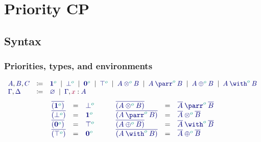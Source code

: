 \documentclass[main.tex]{subfiles}
\begin{document}
\section{Priority CP}

\subsection{Syntax}

\subsubsection{Priorities, types, and environments}
\[
\begin{array}{lcl}
  \ty{A}, \ty{B}, \ty{C}
  & \coloneqq & \ty{\tyone[\cs{o}]}
    \sep        \ty{\tybot[\cs{o}]}
    \sep        \ty{\tynil[\cs{o}]}
    \sep        \ty{\tytop[\cs{o}]}
    \sep        \ty{\tytens[\cs{o}]{A}{B}}
    \sep        \ty{\typarr[\cs{o}]{A}{B}}
    \sep        \ty{\typlus[\cs{o}]{A}{B}}
    \sep        \ty{\tywith[\cs{o}]{A}{B}}
  \\
  \ty{\Gamma}, \ty{\Delta}
  & \coloneqq & \ty{\emptyenv}
    \sep        \ty{\Gamma}, \tmty{x}{A}
\end{array}
\]
\[
\begin{array}{lcl}
  \ty{\co{(\tyone[\cs{o}])}} & = & \ty{\tybot[\cs{o}]} \\
  \ty{\co{(\tybot[\cs{o}])}} & = & \ty{\tyone[\cs{o}]} \\
  \ty{\co{(\tynil[\cs{o}])}} & = & \ty{\tytop[\cs{o}]} \\
  \ty{\co{(\tytop[\cs{o}])}} & = & \ty{\tynil[\cs{o}]}
\end{array}
\qquad
\begin{array}{lcl}
  \ty{\co{(\tytens[\cs{o}]{A}{B})}} & = & \ty{\typarr[\cs{o}]{\co{A}}{\co{B}}} \\
  \ty{\co{(\typarr[\cs{o}]{A}{B})}} & = & \ty{\tytens[\cs{o}]{\co{A}}{\co{B}}} \\
  \ty{\co{(\typlus[\cs{o}]{A}{B})}} & = & \ty{\tywith[\cs{o}]{\co{A}}{\co{B}}} \\
  \ty{\co{(\tywith[\cs{o}]{A}{B})}} & = & \ty{\typlus[\cs{o}]{\co{A}}{\co{B}}}
\end{array}
\]
\end{document}
